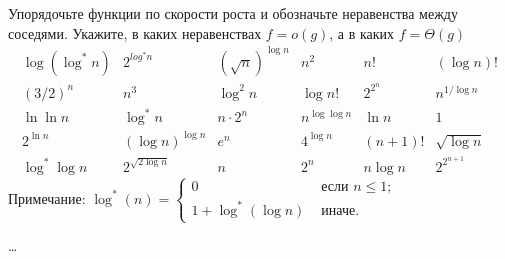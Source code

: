 \begin{problem}
    Упорядочьте функции по скорости роста и обозначьте неравенства между соседями.
    Укажите, в каких неравенствах $f = o(g)$, а в каких $f = \Theta(g)$
    $$
    \begin{array}{cccccc}
        \log(\log^* n) & 2^{log^* n} & (\sqrt{n})^{\log n} & n^2 & n! & (\log n)! \\
        (3 \slash 2)^n & n^3 & \log^2 n & \log n! & 2^{2^n} & n^{1 \slash \log n} \\
        \ln \ln n & \log^* n & n \cdot 2^n & n^{\log \log n} & \ln n & 1 \\
        2^{\ln n} & (\log n)^{\log n} & e^n & 4^{\log n} & (n + 1)! & \sqrt{\log n} \\
        \log^* \log n & 2^{\sqrt{2 \log n}} & n & 2^n & n \log n & 2^{2^{n + 1}}
    \end{array}
    $$
    Примечание: $\log^*(n) = \left\{
        \begin{array}{ll}
            0 & \texttt{ если } n \leq 1;\\
            1 + \log^*(\log n) & \texttt{ иначе.}
        \end{array}
        \right.$
\end{problem}

\begin{solution}
    \ldots
\end{solution}


\clearpage

